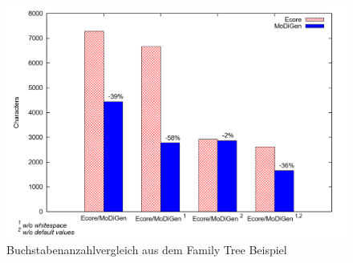 \begin{figure}[H]
\centering
\includegraphics[width=\linewidth]{Abschnitte/Abbildungen/Grafiken/Num-Char-Family-Tree-Model}
\caption{Buchstabenanzahlvergleich aus dem Family Tree Beispiel}
\label{fig:Num-Char-Family-Tree-Model}
\end{figure}